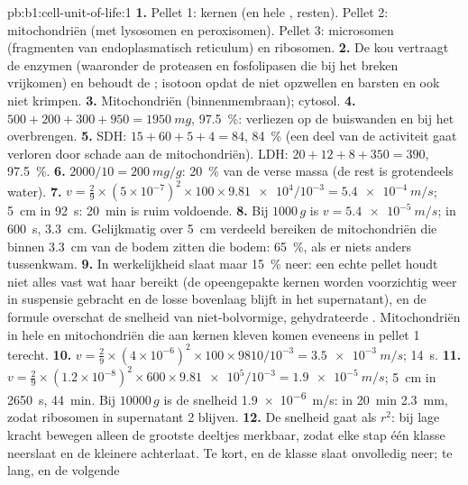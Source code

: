 \begin{solution}{pb:b1:cell-unit-of-life:1}
\textbf{1.} Pellet 1: kernen (en hele , resten). Pellet 2:
mitochondriën (met lysosomen en peroxisomen). Pellet 3: microsomen
(fragmenten van endoplasmatisch reticulum) en ribosomen.
\textbf{2.} De kou vertraagt de enzymen (waaronder de proteasen en
fosfolipasen die bij het breken vrijkomen) en behoudt de ; isotoon
opdat de  niet opzwellen en barsten en ook niet krimpen.
\textbf{3.} Mitochondriën (binnenmembraan); cytosol.
\textbf{4.} $500 + 200 + 300 + 950 = \qty{1950}{mg}$, \qty{97.5}{\%}:
verliezen op de buiswanden en bij het overbrengen.
\textbf{5.} SDH: $15 + 60 + 5 + 4 = 84$, \qty{84}{\%} (een deel van de
activiteit gaat verloren door schade aan de mitochondriën). LDH:
$20 + 12 + 8 + 350 = 390$, \qty{97.5}{\%}.
\textbf{6.} $2000/10 = \qty{200}{mg/g}$: \qty{20}{\%} van de verse massa (de rest is grotendeels water).
\textbf{7.} $v = \frac{2}{9}\times(5\times 10^{-7})^2\times 100\times
\num{9.81e4}/10^{-3} = \qty{5.4e-4}{m/s}$; \qty{5}{cm} in \qty{92}{s}:
\qty{20}{min} is ruim voldoende.
\textbf{8.} Bij $1000\,g$ is $v = \qty{5.4e-5}{m/s}$; in \qty{600}{s},
\qty{3.3}{cm}. Gelijkmatig over \qty{5}{cm} verdeeld bereiken de mitochondriën
die binnen \qty{3.3}{cm} van de bodem zitten die bodem: \qty{65}{\%}, als er
niets anders tussenkwam.
\textbf{9.} In werkelijkheid slaat maar \qty{15}{\%} neer: een echte pellet houdt
niet alles vast wat haar bereikt (de opeengepakte kernen worden voorzichtig weer
in suspensie gebracht en de losse bovenlaag blijft in het supernatant), en de
formule overschat de snelheid van niet-bolvormige, gehydrateerde .
Mitochondriën in hele  en mitochondriën die aan kernen kleven komen
eveneens in pellet 1 terecht.
\textbf{10.} $v = \frac{2}{9}\times(4\times 10^{-6})^2\times 100\times
9810/10^{-3} = \qty{3.5e-3}{m/s}$; \qty{14}{s}.
\textbf{11.} $v = \frac{2}{9}\times(1.2\times 10^{-8})^2\times 600\times
\num{9.81e5}/10^{-3} = \qty{1.9e-5}{m/s}$; \qty{5}{cm} in \qty{2650}{s},
\qty{44}{min}. Bij $\num{10000}\,g$ is de snelheid \qty{1.9e-6}{m/s}: in
\qty{20}{min} \qty{2.3}{mm}, zodat ribosomen in supernatant 2 blijven.
\textbf{12.} De snelheid gaat als $r^2$: bij lage kracht bewegen alleen de
grootste deeltjes merkbaar, zodat elke stap één klasse neerslaat en de kleinere
achterlaat. Te kort, en de klasse slaat onvolledig neer; te lang, en de volgende

\end{solution}
